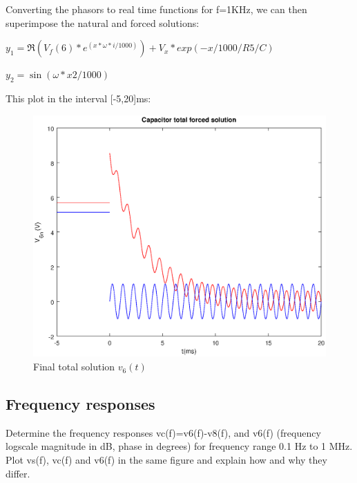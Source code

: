 Converting the phasors to real time functions for f=1KHz, we can then superimpose the natural and forced solutions:

$y_1=\Re(V_f(6)*e^(x*\omega*i/1000))+V_x*exp(-x/1000/R5/C)$

$y_2=\sin(\omega*x2/1000)$



  This plot in the interval [-5,20]ms:

  \begin{figure}[H] \centering
    \includegraphics[width=1\linewidth]{forced.eps}
    \caption{Final total solution $v_{6}(t)$}
    \label{fig:forced}
    \end{figure}
    
\subsection{Frequency responses}
      
  Determine the frequency responses vc(f)=v6(f)-v8(f), and v6(f)  (frequency logscale magnitude in dB, phase in degrees) for frequency range 0.1 Hz to 1 MHz. Plot vs(f),  vc(f)  and v6(f) in the same figure and explain how and why they differ.    
